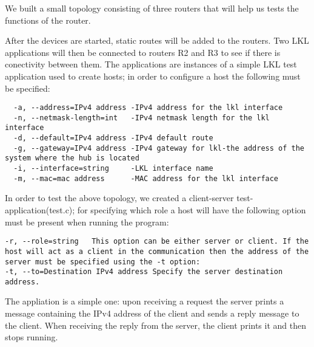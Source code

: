 {{We built a small topology consisting of three routers that will help us tests the functions of the router.

After the devices are started, static routes will be added to the routers. Two LKL applications will then be connected to routers R2 and R3 to see if there is conectivity between them. The applications are instances of a simple LKL test application used to create hosts; in order to configure a host the following must be specified: 
\begin{lstlisting}
  -a, --address=IPv4 address -IPv4 address for the lkl interface
  -n, --netmask-length=int   -IPv4 netmask length for the lkl interface
  -d, --default=IPv4 address -IPv4 default route
  -g, --gateway=IPv4 address -IPv4 gateway for lkl-the address of the system where the hub is located
  -i, --interface=string     -LKL interface name
  -m, --mac=mac address      -MAC address for the lkl interface
\end{lstlisting}

\begin{comment}
  -l, --lkl                  -means that this application uses LKL
  -p, --port=int             Port
  -r, --role=string          server/client
  -t, --to=Destination IPv4 address
                             IPv4 destination
\end{comment}
In order to test the above topology, we created a client-server test-application(test.c); for specifying which role a host will have the following option must be present when running the program:
\begin{lstlisting}
-r, --role=string   This option can be either server or client. If the host will act as a client in the communication then the address of the server must be specified using the -t option:
-t, --to=Destination IPv4 address Specify the server destination address.
\end{lstlisting} 
The appliation is a simple one: upon receiving a request the server prints a message containing the IPv4 address of the client and sends a reply message to the client. When receiving the reply from the server, the client prints it and then stops running.

}}
